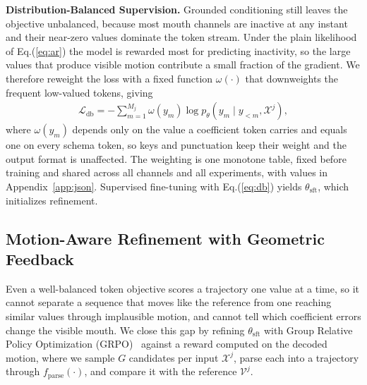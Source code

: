 \noindent\textbf{Distribution-Balanced Supervision.}\quad
Grounded conditioning still leaves the objective unbalanced, because most mouth channels are inactive at any instant and their near-zero values dominate the token stream. Under the plain likelihood of Eq.(\ref{eq:ar}) the model is rewarded most for predicting inactivity, so the large values that produce visible motion contribute a small fraction of the gradient. We therefore reweight the loss with a fixed function $\omega(\cdot)$ that downweights the frequent low-valued tokens, giving
\begin{gather}
    \mathcal{L}_{\mathrm{db}}=-\sum_{m=1}^{M_{j}}\omega\!\left(y_{m}\right)\log p_{\theta}\!\left(y_{m}\mid y_{<m},\mathcal{X}^{j}\right), \label{eq:db}
\end{gather}
where $\omega(y_{m})$ depends only on the value a coefficient token carries and equals one on every schema token, so keys and punctuation keep their weight and the output format is unaffected. The weighting is one monotone table, fixed before training and shared across all channels and all experiments, with values in Appendix~\ref{app:json}. Supervised fine-tuning with Eq.(\ref{eq:db}) yields $\theta_{\mathrm{sft}}$, which initializes refinement.

\subsection{Motion-Aware Refinement with Geometric Feedback}
\label{sec:stage3}

Even a well-balanced token objective scores a trajectory one value at a time, so it cannot separate a sequence that moves like the reference from one reaching similar values through implausible motion, and cannot tell which coefficient errors change the visible mouth. We close this gap by refining $\theta_{\mathrm{sft}}$ with Group Relative Policy Optimization (GRPO)~\citep{shao2024deepseekmath} against a reward computed on the decoded motion, where we sample $G$ candidates per input $\mathcal{X}^{j}$, parse each into a trajectory through $f_{\mathrm{parse}}(\cdot)$, and compare it with the reference $\mathcal{V}^{j}$.

